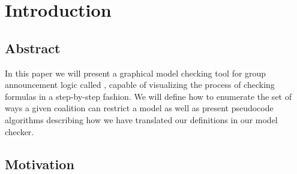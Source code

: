 \section{Introduction}\label{sec:intro}


\subsection*{Abstract}

In this paper we will present a graphical model checking tool for group announcement logic called \cname, capable of visualizing the process of checking formulas in a step-by-step fashion. We will define how to enumerate the set of ways a given coalition can restrict a model as well as present pseudocode algorithms describing how we have translated our definitions in our model checker. 


\subsection{Motivation}

\\
\\
\\






%




